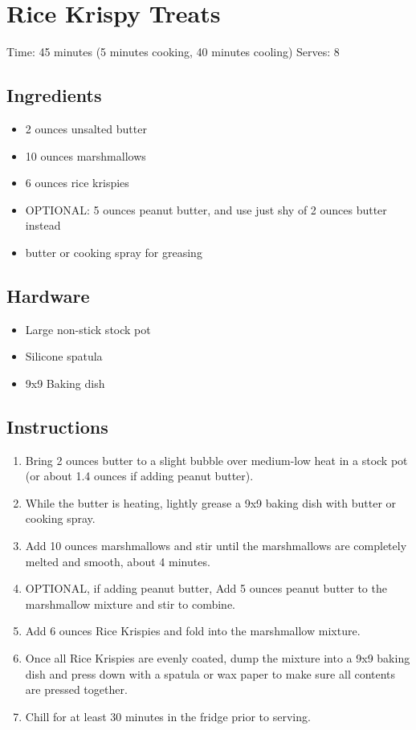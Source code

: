 \section{Rice Krispy Treats}
\label{riceKrispyTreats}
\setcounter{secnumdepth}{0}
Time: 45 minutes (5 minutes cooking, 40 minutes cooling)
Serves: 8

\begin{multicols}{2}
\subsection*{Ingredients}
\begin{itemize}
    \item 2 ounces unsalted butter
    \item 10 ounces marshmallows
    \item 6 ounces rice krispies
    \item OPTIONAL: 5 ounces peanut butter, and use just shy of 2 ounces butter instead
    \item butter or cooking spray for greasing
\end{itemize}

\subsection*{Hardware}
\begin{itemize}
    \item Large non-stick stock pot
    \item Silicone spatula
    \item 9x9 Baking dish
\end{itemize}
\clearpage

\subsection*{Instructions}
\begin{enumerate}
    \item Bring 2 ounces butter to a slight bubble over medium-low heat in a stock pot (or about 1.4 ounces if adding peanut butter).
    \item While the butter is heating, lightly grease a 9x9 baking dish with butter or cooking spray.
    \item Add 10 ounces marshmallows and stir until the marshmallows are completely melted and smooth, about 4 minutes.
    \item OPTIONAL, if adding peanut butter, Add 5 ounces peanut butter to the marshmallow mixture and stir to combine.
    \item Add 6 ounces Rice Krispies and fold into the marshmallow mixture.
    \item Once all Rice Krispies are evenly coated, dump the mixture into a 9x9 baking dish and press down with a spatula or wax paper to make sure all contents are pressed together.
    \item Chill for at least 30 minutes in the fridge prior to serving.
\end{enumerate}


\end{multicols}
